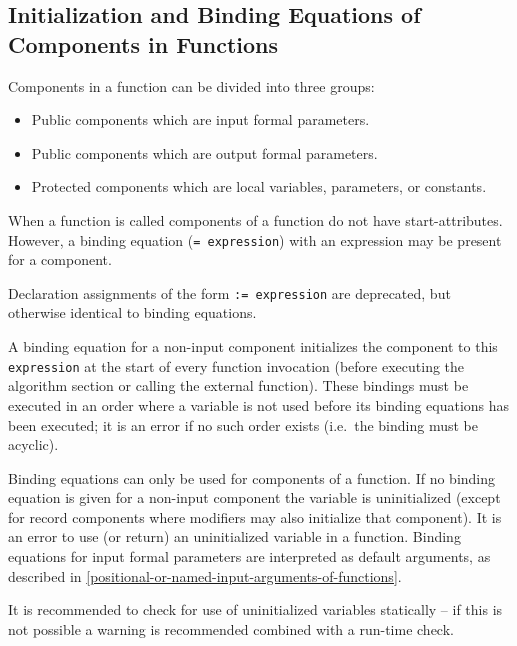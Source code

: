 \subsection{Initialization and Binding Equations of Components in Functions}
\label{initialization-and-binding-equations-of-components-in-functions}
\label{initialization-and-declaration-assignments-of-components-in-functions}

Components in a function can be divided into three groups:
\begin{itemize}
\item
  Public components which are input formal parameters.
\item
  Public components which are output formal parameters.
\item
  Protected components which are local variables, parameters, or
  constants.
\end{itemize}

When a function is called components of a function do not have
start-attributes. However, a binding equation (\lstinline!= expression!) with
an expression may be present for a component.
\begin{nonnormative}
Declaration assignments of the form \lstinline!:= expression! are deprecated, but otherwise identical to binding equations.
\end{nonnormative}

A binding equation for a non-input component initializes the
component to this \lstinline!expression! at the start of every function invocation
(before executing the algorithm section or calling the external
function). These bindings must be executed in an order where a variable
is not used before its binding equations has been executed; it is
an error if no such order exists (i.e.\ the binding must be acyclic).

Binding equations can only be used for components of a function.
If no binding equation is given for a non-input component the
variable is uninitialized (except for record components where modifiers
may also initialize that component). It is an error to use (or return)
an uninitialized variable in a function.  Binding equations for input
formal parameters are interpreted as default arguments, as described in
\cref{positional-or-named-input-arguments-of-functions}.

\begin{nonnormative}
It is recommended to check for use of uninitialized variables statically -- if this is not possible a warning is recommended
combined with a run-time check.
\end{nonnormative}

